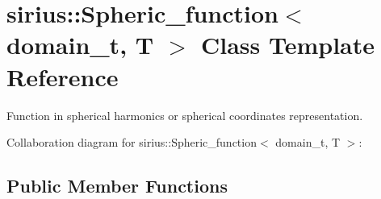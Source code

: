 \hypertarget{classsirius_1_1_spheric__function}{}\section{sirius\+:\+:Spheric\+\_\+function$<$ domain\+\_\+t, T $>$ Class Template Reference}
\label{classsirius_1_1_spheric__function}


Function in spherical harmonics or spherical coordinates representation.  




Collaboration diagram for sirius\+:\+:Spheric\+\_\+function$<$ domain\+\_\+t, T $>$\+:
\subsection*{Public Member Functions}
